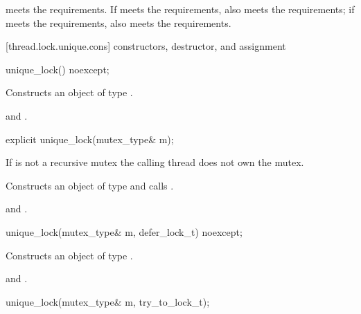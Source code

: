 \pnum
\begin{note}  meets the  requirements. If 
meets the  requirements,
 also meets the  requirements;
if 
meets the  requirements,
 also meets the  requirements. \end{note}

[thread.lock.unique.cons]{ constructors, destructor, and assignment}

%
\begin{itemdecl}
unique_lock() noexcept;
\end{itemdecl}

\begin{itemdescr}
\pnum
\effects Constructs an object of type .

\pnum
\postconditions {} and .
\end{itemdescr}

%
\begin{itemdecl}
explicit unique_lock(mutex_type& m);
\end{itemdecl}

\begin{itemdescr}
\pnum
\requires If  is not a recursive mutex the calling thread does not own the mutex.

\pnum
\effects Constructs an object of type  and calls .

\pnum
\postconditions {} and .
\end{itemdescr}

%
\begin{itemdecl}
unique_lock(mutex_type& m, defer_lock_t) noexcept;
\end{itemdecl}

\begin{itemdescr}
\pnum
\effects Constructs an object of type .

\pnum
\postconditions {} and .
\end{itemdescr}

%
\begin{itemdecl}
unique_lock(mutex_type& m, try_to_lock_t);
\end{itemdecl}

